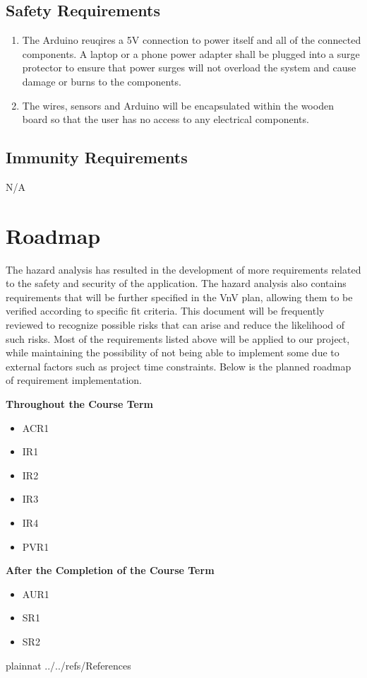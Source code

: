 \documentclass{article}
\begin{document}
\subsection{Safety Requirements}
\begin{enumerate}[{SR}1., leftmargin=2\parindent]
    \item The Arduino reuqires a 5V connection to power itself and all of the connected components. A laptop or a phone power adapter shall be plugged into a
        surge protector to ensure that power surges will not overload the system and cause damage or burns to the components.
    \item The wires, sensors and Arduino will be encapsulated within the wooden board so that the user has no access to any electrical components.
\end{enumerate}

\subsection{Immunity Requirements}
N/A

\section{Roadmap}

The hazard analysis has resulted in the development of more requirements related to the safety and security of the application. The hazard 
analysis also contains requirements that will be further specified in the VnV plan, allowing them to be verified according to specific 
fit criteria. This document will be frequently reviewed to recognize possible risks that can arise and reduce the likelihood of such
risks. Most of the requirements listed above will be applied to our project, while maintaining the possibility of not being able to 
implement some due to external factors such as project time constraints. Below is the planned roadmap of requirement implementation.

\textbf{Throughout the Course Term}
\begin{itemize}
    \item ACR1
    \item IR1
    \item IR2
    \item IR3
    \item IR4
    \item PVR1
\end{itemize}

\textbf{After the Completion of the Course Term}
\begin{itemize}
    \item AUR1
    \item SR1
    \item SR2
\end{itemize}

\newpage

 {plainnat}
 {../../refs/References}
\end{document}
